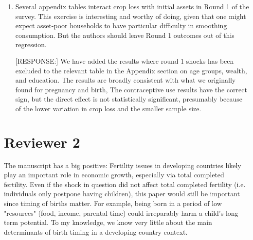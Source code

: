 \documentclass[letterpaper,12pt]{article}
\begin{document}
\begin{enumerate}
\item Several appendix tables interact crop loss with initial assets in
Round 1 of the survey. This exercise is interesting and worthy of doing,
given that one might expect asset-poor households to have particular
difficulty in smoothing consumption. But the authors should leave Round
1 outcomes out of this regression.

[RESPONSE:] We have added the results where round 1 shocks has been 
excluded to the relevant table in the Appendix section on age
groups, wealth, and education.
The results are broadly consistent with what we originally found
for pregnancy and birth, 
The contraceptive use results have the correct sign, but the direct
effect is not statistically significant, presumably because of the 
lower variation in crop loss and the smaller sample size.


\end{enumerate}



\newpage

\section*{Reviewer 2}


The manuscript has a big positive: Fertility issues in developing
countries likely play an important role in economic growth, especially
via total completed fertility. Even if the shock in question did not
affect total completed fertility (i.e. individuals only postpone having
children), this paper would still be important since timing of births
matter. For example, being born in a period of low "resources" (food,
income, parental time) could irreparably harm a child's long-term
potential. To my knowledge, we know very little about the main
determinants of birth timing in a developing country context.
\end{document}
